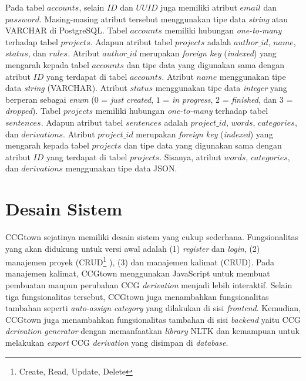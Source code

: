 Pada tabel $accounts$, selain $ID$ dan $UUID$ juga memiliki atribut $email$ dan
$password$. Masing-masing atribut tersebut menggunakan tipe data \textit{string}
atau VARCHAR di PostgreSQL.
Tabel $accounts$ memiliki hubungan \textit{one-to-many} terhadap tabel $projects$.
Adapun atribut tabel $projects$ adalah $author\_id$, $name$, $status$, dan $rules$.
Atribut $author\_id$ merupakan \textit{foreign key} (\textit{indexed}) yang
mengarah kepada tabel $accounts$ dan tipe data yang digunakan sama dengan
atribut $ID$ yang terdapat di tabel $accounts$.
Atribut $name$ menggunakan tipe data \textit{string} (VARCHAR).
Atribut $status$ menggunakan tipe data \textit{integer} yang berperan sebagai
\textit{enum} ($0$ = \textit{just created}, $1$ = \textit{in progress},
$2$ = \textit{finished}, dan $3$ = \textit{dropped}).
Tabel $projects$ memiliki hubungan \textit{one-to-many} terhadap tabel $sentences$.
Adapun atribut tabel $sentences$ adalah $project\_id$, $words$, $categories$, dan
$derivations$. Atribut $project\_id$ merupakan \textit{foreign key}
(\textit{indexed}) yang mengarah kepada tabel $projects$ dan tipe data yang digunakan
sama dengan atribut $ID$ yang terdapat di tabel $projects$.
Sisanya, atribut $words$, $categories$, dan $derivations$ menggunakan tipe data JSON.


\section{Desain Sistem}
CCGtown sejatinya memiliki desain sistem yang cukup sederhana.
Fungsionalitas yang akan didukung untuk versi awal adalah (1) \textit{register} dan
\textit{login}, (2) manajemen proyek (CRUD\footnote{Create, Read, Update, Delete}
), (3) dan manajemen kalimat (CRUD).
Pada manajemen kalimat, CCGtown menggunakan JavaScript untuk membuat pembuatan
maupun perubahan CCG \textit{derivation} menjadi lebih interaktif.
Selain tiga fungsionalitas tersebut, CCGtown juga menambahkan fungsionalitas tambahan
seperti \textit{auto-assign category} yang dilakukan di sisi \textit{frontend}.
Kemudian, CCGtown juga menambahkan fungsionalitas tambahan di sisi \textit{backend}
yaitu CCG \textit{derivation generator} dengan memanfaatkan \textit{library} NLTK
dan kemampuan untuk melakukan \textit{export} CCG \textit{derivation} yang disimpan
di \textit{database}.

